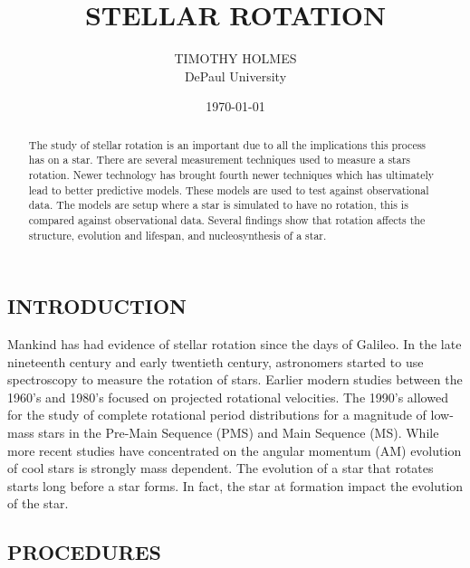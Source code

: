 \documentclass[a4paper, 12pt]{article}
\title{STELLAR ROTATION}
\author{TIMOTHY HOLMES \\ 
        DePaul University}
\date{\today}
\begin{document}
\maketitle

\begin{abstract}
The study of stellar rotation is an important due to all the implications this process has on a star. There are several measurement techniques used to measure a stars rotation. Newer technology has brought fourth newer techniques which has ultimately lead to better predictive models. These models are used to test against observational data. The models are setup where a star is simulated to have no rotation, this is compared against observational data. Several findings show that rotation affects the structure, evolution and lifespan, and nucleosynthesis of a star. 
\end{abstract}

\begin{center}
\section{INTRODUCTION}
\end{center}

Mankind has had evidence of stellar rotation since the days of Galileo. In the late nineteenth century and early twentieth century, astronomers started to use spectroscopy to measure the rotation of stars. Earlier modern studies between the 1960's and 1980's focused on projected rotational velocities. The 1990's allowed for the study of complete rotational period distributions for a magnitude of low-mass stars in the Pre-Main Sequence (PMS) and Main Sequence (MS). While more recent studies have concentrated on the angular momentum (AM) evolution of cool stars is strongly mass dependent. 
The evolution of a star that rotates starts long before a star forms. In fact, the star at formation impact the evolution of the star.

\begin{center}
\section{PROCEDURES}
\end{center}
\end{document}

